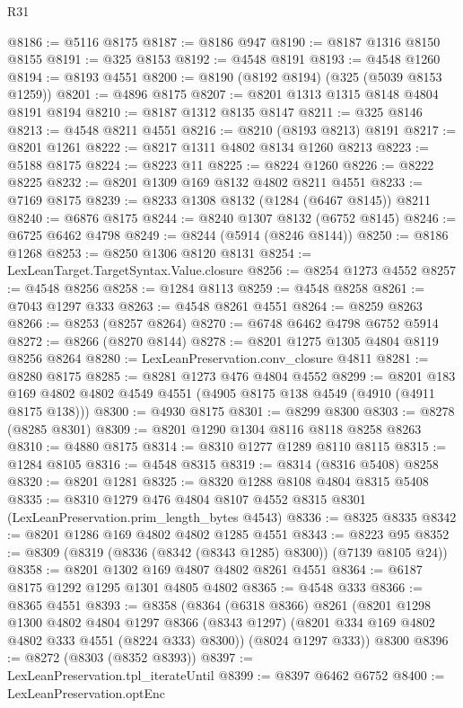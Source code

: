 \begin{lexlean}{R31}
\begin{coremodule}
@8186 := @5116 @8175
@8187 := @8186 @947
@8190 := @8187 @1316 @8150 @8155
@8191 := @325 @8153
@8192 := @4548 @8191
@8193 := @4548 @1260
@8194 := @8193 @4551
@8200 := @8190 (@8192 @8194) (@325 (@5039 @8153 @1259))
@8201 := @4896 @8175
@8207 := @8201 @1313 @1315 @8148 @4804 @8191 @8194
@8210 := @8187 @1312 @8135 @8147
@8211 := @325 @8146
@8213 := @4548 @8211 @4551
@8216 := @8210 (@8193 @8213) @8191
@8217 := @8201 @1261
@8222 := @8217 @1311 @4802 @8134 @1260 @8213
@8223 := @5188 @8175
@8224 := @8223 @11
@8225 := @8224 @1260
@8226 := @8222 @8225
@8232 := @8201 @1309 @169 @8132 @4802 @8211 @4551
@8233 := @7169 @8175
@8239 := @8233 @1308 @8132 (@1284 (@6467 @8145)) @8211
@8240 := @6876 @8175
@8244 := @8240 @1307 @8132 (@6752 @8145)
@8246 := @6725 @6462 @4798
@8249 := @8244 (@5914 (@8246 @8144))
@8250 := @8186 @1268
@8253 := @8250 @1306 @8120 @8131
@8254 := LexLeanTarget.TargetSyntax.Value.closure
@8256 := @8254 @1273 @4552
@8257 := @4548 @8256
@8258 := @1284 @8113
@8259 := @4548 @8258
@8261 := @7043 @1297 @333
@8263 := @4548 @8261 @4551
@8264 := @8259 @8263
@8266 := @8253 (@8257 @8264)
@8270 := @6748 @6462 @4798 @6752 @5914
@8272 := @8266 (@8270 @8144)
@8278 := @8201 @1275 @1305 @4804 @8119 @8256 @8264
@8280 := LexLeanPreservation.conv_closure @4811
@8281 := @8280 @8175
@8285 := @8281 @1273 @476 @4804 @4552
@8299 := @8201 @183 @169 @4802 @4802 @4549 @4551 (@4905 @8175 @138 @4549 (@4910 (@4911 @8175 @138)))
@8300 := @4930 @8175
@8301 := @8299 @8300
@8303 := @8278 (@8285 @8301)
@8309 := @8201 @1290 @1304 @8116 @8118 @8258 @8263
@8310 := @4880 @8175
@8314 := @8310 @1277 @1289 @8110 @8115
@8315 := @1284 @8105
@8316 := @4548 @8315
@8319 := @8314 (@8316 @5408) @8258
@8320 := @8201 @1281
@8325 := @8320 @1288 @8108 @4804 @8315 @5408
@8335 := @8310
    @1279
    @476
    @4804
    @8107
    @4552
    @8315
    @8301
    (LexLeanPreservation.prim_length_bytes @4543)
@8336 := @8325 @8335
@8342 := @8201 @1286 @169 @4802 @4802 @1285 @4551
@8343 := @8223 @95
@8352 := @8309 (@8319 (@8336 (@8342 (@8343 @1285) @8300)) (@7139 @8105 @24))
@8358 := @8201 @1302 @169 @4807 @4802 @8261 @4551
@8364 := @6187 @8175 @1292 @1295 @1301 @4805 @4802
@8365 := @4548 @333
@8366 := @8365 @4551
@8393 := @8358
    (@8364
      (@6318 @8366)
      @8261
      (@8201
        @1298
        @1300
        @4802
        @4804
        @1297
        @8366
        (@8343 @1297)
        (@8201 @334 @169 @4802 @4802 @333 @4551 (@8224 @333) @8300))
      (@8024 @1297 @333))
    @8300
@8396 := @8272 (@8303 (@8352 @8393))
@8397 := LexLeanPreservation.tpl_iterateUntil
@8399 := @8397 @6462 @6752
@8400 := LexLeanPreservation.optEnc

\end{coremodule}
\end{lexlean}
